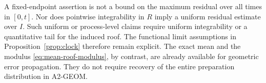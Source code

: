 A fixed-endpoint assertion is not a bound on the maximum residual over
all times in $[0,t]$. Nor does pointwise integrability in $R$ imply a
uniform residual estimate over $I$. Such uniform or process-level
claims require uniform integrability or a quantitative tail for the
induced roof. The functional limit assumptions in
Proposition~\ref{prop:clock} therefore remain explicit. The exact
mean and the modulus \eqref{eq:mean-roof-modulus}, by contrast, are
already available for geometric error propagation. They do not
require recovery of the entire preparation distribution in A2-GEOM.
